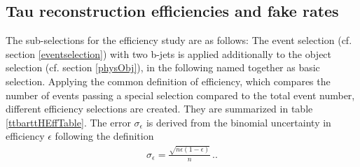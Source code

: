 \subsection{Tau reconstruction efficiencies and fake rates}\label{bgeff}
The sub-selections for the efficiency study are as follows: The event selection (cf. section \ref{eventselection}) with two b-jets is applied additionally to the object selection (cf. section \ref{physObj}), in the following named together as basic selection. Applying the common definition of efficiency, which compares the number of events passing a special selection compared to the total event number, different efficiency selections are created. They are summarized in table \ref{ttbarttHEffTable}. The error $\sigma_\epsilon$ is derived from the binomial uncertainty in efficiency $\epsilon$ following the definition
\begin{align}
\sigma_\epsilon=\frac{\sqrt{n\epsilon\left(1-\epsilon\right)}}{n}\,\text{.}.
\label{binomialerror}
\end{align}
%	
